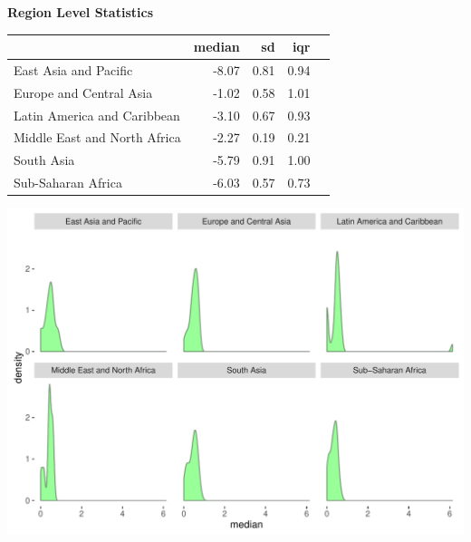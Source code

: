\documentclass{article}\usepackage[]{graphicx}\usepackage[]{color}
\makeatletter
\def\maxwidth{ %
  \ifdim\Gin@nat@width>\linewidth
    \linewidth
  \else
    \Gin@nat@width
  \fi
}
\makeatother
\begin{document}
\newpage

  \raggedright{\color{white!30!black} \textbf{\Large Region Level Statistics}}
    \begin{minipage}[c]{0.99\textwidth}  
      \vspace*{0.4cm}
      
\begin{tabular}{lrrrl}
  & median & sd & iqr &  \\ 
  \hline
East Asia and Pacific & -8.07 & 0.81 & 0.94 &  \\ 
  Europe and Central Asia & -1.02 & 0.58 & 1.01 &  \\ 
  Latin America and Caribbean & -3.10 & 0.67 & 0.93 &  \\ 
  Middle East and North Africa & -2.27 & 0.19 & 0.21 &  \\ 
  South Asia & -5.79 & 0.91 & 1.00 &  \\ 
  Sub-Saharan Africa & -6.03 & 0.57 & 0.73 &  \\ 
  \end{tabular}

      \vspace*{1cm}
    \end{minipage}
    
    \begin{minipage}[c]{0.99\textwidth}  
    


{\centering \includegraphics[width=\maxwidth]{figure/plot4-1} 

}



      \vspace*{0.5cm}
    \end{minipage}

\end{document}
